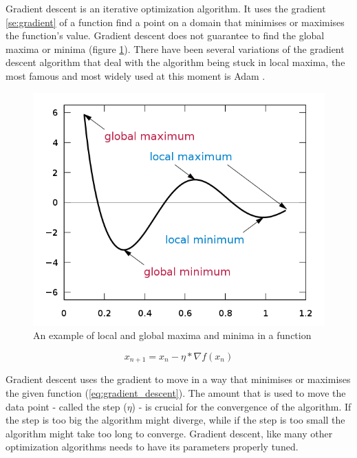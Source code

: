\documentclass[times, utf8, diplomski]{fer}
\begin{document}
Gradient descent is an iterative optimization algorithm. It uses the gradient \ref{se:gradient} of  a function find a point on a domain that minimises or maximises the function's value. Gradient descent does not guarantee to find the global maxima or minima (figure \ref{fig:local_and_global_function_values}). There have been several variations of the gradient descent algorithm that deal with the algorithm being stuck in local maxima, the most famous and most widely used at this moment is Adam \citep{kingma_adam:_2014}.

\begin{figure}
  \includegraphics[scale=0.5]{figures/local_global_maxima_minima.png}
  \centering
  \caption{An example of local and global maxima and minima in a function}
  \label{fig:local_and_global_function_values}
\end{figure}

\begin{equation} 
\label{eq:gradient_descent}
	x_{n+1} = x_n - \eta * \nabla{f(x_n)}
\end{equation}

Gradient descent uses the gradient to move in a way that minimises or maximises the given function (\ref{eq:gradient_descent}). The amount that is used to move the data point - called the step ($\eta$) - is crucial for the convergence of the algorithm. If the step is too big the algorithm might diverge, while if the step is too small the algorithm might take too long to converge. Gradient descent, like many other optimization algorithms needs to have its parameters properly tuned.
\end{document}
